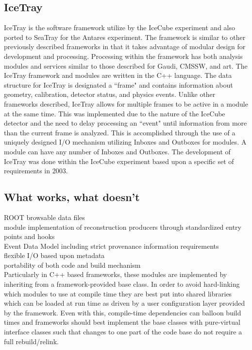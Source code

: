 \subsection{IceTray}

IceTray is the software framework utilize by the IceCube experiment and also ported to SeaTray for the Antares experiment. The framework is similar to other previously described frameworks in that it takes advantage of modular design for development and processing. Processing within the framework has both analysis modules and services similar to those described for Gaudi, CMSSW, and art. The IceTray framework and modules are written in the C++ language. The data structure for IceTray is designated a ``frame" and contains information about geometry, calibration, detector status, and physics events. Unlike other frameworks described, IceTray allows for multiple frames to be active in a module at the same time. This was implemented due to the nature of the IceCube detector and the need to delay processing an ``event" until information from more than the current frame is analyzed. This is accomplished through the use of a uniquely designed I/O mechanism utilizing Inboxes and Outboxes for modules. A module can have any number of Inboxes and Outboxes. The development of IceTray was done within the IceCube experiment based upon a specific set of requirements in 2003.


\subsection{What works, what doesn't}

	ROOT browsable data files\\
	module implementation of reconstruction producers through standardized entry points and hooks\\
	Event Data Model including strict provenance information requirements\\
	flexible I/O based upon metadata\\
	portability of both code and build mechanism\\
	
	Particularly in C++ based frameworks,
these modules are implemented by inheriting from a framework-provided
base class. In order to avoid hard-linking which modules to use at
compile time they are best put into shared libraries which can be
loaded at run time as driven by a user configuration layer provided by
the framework.  Even with this, compile-time dependencies can balloon
build times and frameworks should best implement the base classes with
pure-virtual interface classes such that changes to one part of the
code base do not require a full rebuild/relink.

